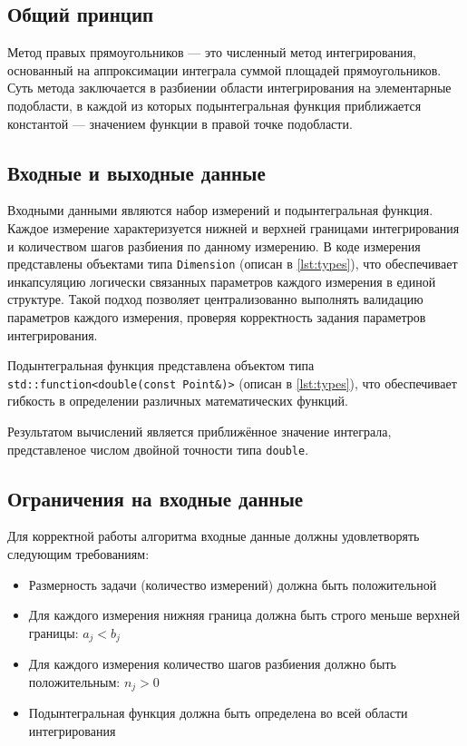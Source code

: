 \documentclass[a4paper,12pt]{article}
\begin{document}
  \subsection{Общий принцип}\label{subsec:general_principle}

  Метод правых прямоугольников --- это численный метод интегрирования, основанный на аппроксимации интеграла суммой площадей прямоугольников.
  Суть метода заключается в разбиении области интегрирования на элементарные подобласти, в каждой из которых подынтегральная функция приближается константой --- значением функции в правой точке подобласти.

  \subsection{Входные и выходные данные}\label{subsec:input_output}

  Входными данными являются набор измерений и подынтегральная функция.
  Каждое измерение характеризуется нижней и верхней границами интегрирования и количеством шагов разбиения по данному измерению.
  В коде измерения представлены объектами типа \texttt{Dimension} (описан в  \autoref{lst:types}), что обеспечивает инкапсуляцию логически связанных параметров каждого измерения в единой структуре.
  Такой подход позволяет централизованно выполнять валидацию параметров каждого измерения, проверяя корректность задания параметров интегрирования.

  Подынтегральная функция представлена объектом типа \texttt{std::function<double(const Point\&)>} (описан в \autoref{lst:types}), что обеспечивает гибкость в определении различных математических функций.

  Результатом вычислений является приближённое значение интеграла, представленое числом двойной точности типа \texttt{double}.

  \subsection{Ограничения на входные данные}\label{subsec:constraints}

  Для корректной работы алгоритма входные данные должны удовлетворять следующим требованиям:
  \begin{itemize}
    \item Размерность задачи (количество измерений) должна быть положительной
    \item Для каждого измерения нижняя граница должна быть строго меньше верхней границы: $a_j < b_j$
    \item Для каждого измерения количество шагов разбиения должно быть положительным: $n_j > 0$
    \item Подынтегральная функция должна быть определена во всей области интегрирования
  \end{itemize}
\end{document}
